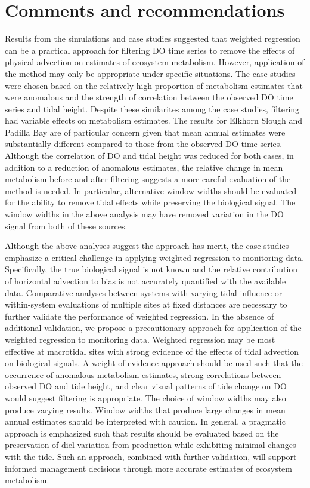 \documentclass[letterpaper,12pt,oneside]{article}\usepackage[]{graphicx}\usepackage[]{color}
\begin{document}
\section{Comments and recommendations}

Results from the simulations and case studies suggested that weighted regression can be a practical approach for filtering \ac{DO} time series to remove the effects of physical advection on estimates of ecosystem metabolism.  However, application of the method may only be appropriate under specific situations.  The case studies were chosen based on the relatively high proportion of metabolism estimates that were anomalous and the strength of correlation between the observed \ac{DO} time series and tidal height.  Despite these similarites among the case studies, filtering had variable effects on metabolism estimates.  The results for Elkhorn Slough and Padilla Bay are of particular concern given that mean annual estimates were substantially different compared to those from the observed \ac{DO} time series.  Although the correlation of \ac{DO} and tidal height was reduced for both cases, in addition to a reduction of anomalous estimates, the relative change in mean metabolism before and after filtering suggests a more careful evaluation of the method is needed.  In particular, alternative window widths should be evaluated for the ability to remove tidal effects while preserving the biological signal.  The window widths in the above analysis may have removed variation in the \ac{DO} signal from both of these sources.    

Although the above analyses suggest the approach has merit, the case studies emphasize a critical challenge in applying weighted regression to monitoring data. Specifically, the true biological signal is not known and the relative contribution of horizontal advection to bias is not accurately quantified with the available data.  Comparative analyses between systems with varying tidal influence or within-system evaluations of multiple sites at fixed distances are necessary to further validate the performance of weighted regression.  In the absence of additional validation, we propose a precautionary approach for application of the weighted regression to monitoring data.  Weighted regression may be most effective at macrotidal sites with strong evidence of the effects of tidal advection on biological signals.  A weight-of-evidence approach should be used such that the occurrence of anomalous metabolism estimates, strong correlations between observed \ac{DO} and tide height, and clear visual patterns of tide change on \ac{DO} would suggest filtering is appropriate.  The choice of window widths may also produce varying results.  Window widths that produce large changes in mean annual estimates should be interpreted with caution.  In general, a pragmatic approach is emphasized such that results should be evaluated based on the preservation of diel variation from production while exhibiting minimal changes with the tide.  Such an approach, combined with further validation, will support informed management decisions through more accurate estimates of ecosystem metabolism.  
\end{document}
